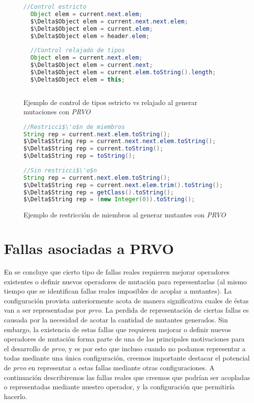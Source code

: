 \begin{figure}
	\begin{lstlisting}[mathescape=true, language=Java, extendedchars=true,basicstyle={}]
  //Control estricto
  Object elem = current.next.elem;
  $\Delta$Object elem = current.next.next.elem;
  $\Delta$Object elem = current.elem;
  $\Delta$Object elem = header.elem;
  
  //Control relajado de tipos
  Object elem = current.next.elem;
  $\Delta$Object elem = current.next;
  $\Delta$Object elem = current.elem.toString().length;
  $\Delta$Object elem = this;
	
	\end{lstlisting}
	\caption{Ejemplo de control de tipos estricto vs relajado al generar mutaciones con \emph{PRVO}}
	\label{figures.examples.strictVsRelaxedTypeCheck}
\end{figure}

\begin{figure}
	\begin{lstlisting}[mathescape=true, language=Java, extendedchars=true,basicstyle={}]
//Restricci$\'o$n de miembros
String rep = current.next.elem.toString();
$\Delta$String rep = current.next.next.elem.toString();
$\Delta$String rep = current.toString();
$\Delta$String rep = toString();
	
//Sin restricci$\'o$n
String rep = current.next.elem.toString();
$\Delta$String rep = current.next.elem.trim().toString();
$\Delta$String rep = getClass().toString();
$\Delta$String rep = (new Integer(0)).toString();
	\end{lstlisting}
	\caption{Ejemplo de restricci\'on de miembros al generar mutantes con \emph{PRVO}}
	\label{figures.examples.memberRestriction}
\end{figure}

\section{Fallas asociadas a PRVO}
\label{sec:prvo.prvoTargetedFaults}

En \cite{bibliography.mutation.evaluation.valid-substitute} se concluye que cierto tipo de fallas reales requieren mejorar operadores existentes o definir nuevos operadores de mutaci\'on para representarlas (al mismo tiempo que se identifican fallas reales imposibles de acoplar a mutantes). La configuraci\'on provista anteriormente acota de manera significativa cuales de \'estas van a ser representadas por \emph{prvo}. La perdida de representaci\'on de ciertas fallas es causada por la necesidad de acotar la cantidad de mutantes generados. Sin embargo, la existencia de estas fallas que requieren mejorar o definir nuevos operadores de mutaci\'on forma parte de una de las principales motivaciones para el desarrollo de \emph{prvo}, y es por esto que incluso cuando no podamos representar a todas mediante una \'unica configuraci\'on, creemos importante destacar el potencial de \emph{prvo} en representar a estas fallas mediante otras configuraciones. A continuaci\'on describiremos las fallas reales que creemos que podr\'ian ser acopladas o representadas mediante nuestro operador, y la configuraci\'on que permitir\'ia hacerlo.

